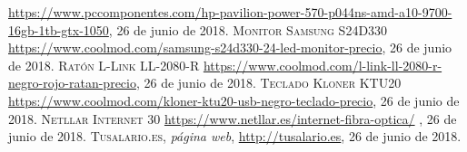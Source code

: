 \documentclass[pdftex,11pt,a4paper]{book}
\begin{document}
\begin{thebibliography}{X}
 \url{https://www.pccomponentes.com/hp-pavilion-power-570-p044ns-amd-a10-9700-16gb-1tb-gtx-1050},
  26 de junio de 2018.
 \textsc{Monitor Samsung S24D330}
 \url{https://www.coolmod.com/samsung-s24d330-24-led-monitor-precio},
  26 de junio de 2018.
 \textsc{Ratón L-Link LL-2080-R}
 \url{https://www.coolmod.com/l-link-ll-2080-r-negro-rojo-ratan-precio},
  26 de junio de 2018.
 \textsc{Teclado Kloner KTU20}
 \url{https://www.coolmod.com/kloner-ktu20-usb-negro-teclado-precio},
  26 de junio de 2018.
 \textsc{Netllar Internet 30}
 \url{https://www.netllar.es/internet-fibra-optica/}
,
  26 de junio de 2018.
 \textsc{Tusalario.es},
 \textit{página web},
 \url{http://tusalario.es},
  26 de junio de 2018.
\end{thebibliography}



\appendix




\end{document}
